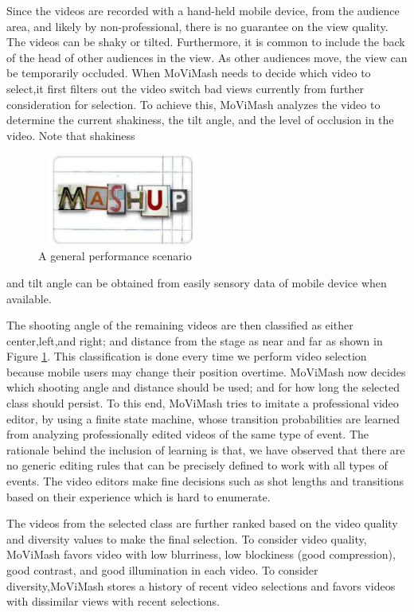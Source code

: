 \documentclass{sig-alternate}
\begin{document}
 Since the videos are recorded with a hand-held mobile device, from the audience area, and likely by non-professional, there is no guarantee on the view quality. The videos can be shaky or tilted. Furthermore, it is common to include the back of the head of other audiences in the view. As other audiences move, the view can be temporarily occluded. When MoViMash needs to decide which video to select,it first filters out the video switch bad views currently from further consideration for selection. To achieve this, MoViMash analyzes the video to determine the current shakiness, the tilt angle, and the level of occlusion in the video. Note that shakiness
 \begin{figure}[h]
\includegraphics[width=0.5\textwidth ,height = 3cm]{11}
\caption{A general performance scenario}
\label{fig:figure1}
\end{figure}
and tilt angle can be obtained from easily sensory data of mobile device when available. 

The shooting angle of the remaining videos are then classiﬁed as either center,left,and right; and distance from the stage as near and far as shown in Figure \ref{fig:figure1}. This classiﬁcation is done every time we perform video selection because mobile users may change their position overtime. MoViMash now decides which shooting angle and distance should be used; and for how long the selected class should persist. To this end, MoViMash tries to imitate a professional video editor, by using a ﬁnite state machine, whose transition probabilities are learned from analyzing professionally edited videos of the same type of event. The rationale behind the inclusion of learning is that, we have observed that there are no generic editing rules that can be precisely deﬁned to work with all types of events. The video editors make ﬁne decisions such as shot lengths and transitions based on their experience which is hard to enumerate. 

The videos from the selected class are further ranked based on the video quality and diversity values to make the ﬁnal selection. To consider video quality, MoViMash favors video with low blurriness, low blockiness (good compression), good contrast, and good illumination in each video. To consider diversity,MoViMash stores a history of recent video selections and favors videos with dissimilar views with recent selections. 
\end{document}

